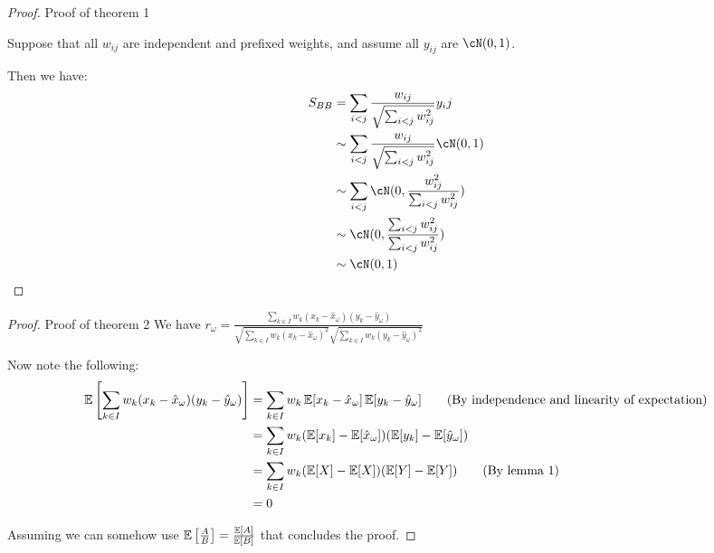 \documentclass[11pt]{hw-template}
\begin{document}
  \begin{proof} Proof of theorem 1
    
    Suppose that all $w_{ij}$ are independent and prefixed weights, and assume all $y_{ij}$ are $\cN(0, 1)$. 
    
    Then we have:
    \begin{align*}
      S_{BB} 
      &= \sum_{i < j} \frac{w_{ij}}{\sqrt{\sum_{i < j}w_{ij}^2}}y_ij\\
      &\sim \sum_{i < j} \frac{w_{ij}}{\sqrt{\sum_{i < j}w_{ij}^2}}\cN(0, 1)\\
      &\sim \sum_{i < j} \cN(0, \frac{w_{ij}^2}{\sum_{i < j}w_{ij}^2})\\
      &\sim  \cN(0, \frac{\sum_{i < j}w_{ij}^2}{\sum_{i < j}w_{ij}^2})\\
      &\sim  \cN(0, 1)
    \end{align*}
    
  \end{proof}
  
  \begin{proof} Proof of theorem 2
    We have $r_\omega = \frac{\sum_{k \in I} w_k(x_k - \hat{x}_{\omega})(y_k - \hat{y}_{\omega})}{\sqrt{\sum_{k \in I} w_k(x_k - \hat{x}_{\omega})^2}\sqrt{\sum_{k \in I} w_k(y_k - \hat{y}_{\omega})^2}}$
    
    Now note the following:
    \begin{align*}
      \operatorname{\mathbb{E}}\left[\sum_{k \in I} w_k(x_k - \hat{x}_{\omega})(y_k - \hat{y}_{\omega})\right]
      &= \sum_{k \in I} w_k\operatorname{\mathbb{E}}[x_k - \hat{x}_{\omega}]\operatorname{\mathbb{E}}[y_k - \hat{y}_{\omega}] \tag{By independence and linearity of expectation} \\
      &= \sum_{k \in I} w_k(\operatorname{\mathbb{E}}[x_k] - \operatorname{\mathbb{E}}[\hat{x}_{\omega}])(\operatorname{\mathbb{E}}[y_k] - \operatorname{\mathbb{E}}[\hat{y}_{\omega}]) \\
      &= \sum_{k \in I} w_k(\operatorname{\mathbb{E}}[X] - \operatorname{\mathbb{E}}[X])(\operatorname{\mathbb{E}}[Y] - \operatorname{\mathbb{E}}[Y]) \tag{By lemma 1} \\
      &= 0
    \end{align*}
    
    Assuming we can somehow use $\operatorname{\mathbb{E}}\left[\frac{A}{B}\right] = \frac{\operatorname{\mathbb{E}}[A]}{\operatorname{\mathbb{E}}[B]}$ that concludes the proof.
  \end{proof}
  
\end{document}
